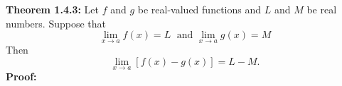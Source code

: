 \documentclass{article}
\begin{document}
	\textbf{Theorem 1.4.3:} Let $f$ and $g$ be real-valued functions and $L$ and $M$ be real numbers. Suppose that
	$$\lim_{x \to a}{f(x)} = L \; \text{ and } \lim_{x \to a}{g(x)} = M$$
	Then
	$$\lim_{x \to a}[{f(x) - g(x)}] = L - M.$$
	\textbf{Proof:}
\end{document}
